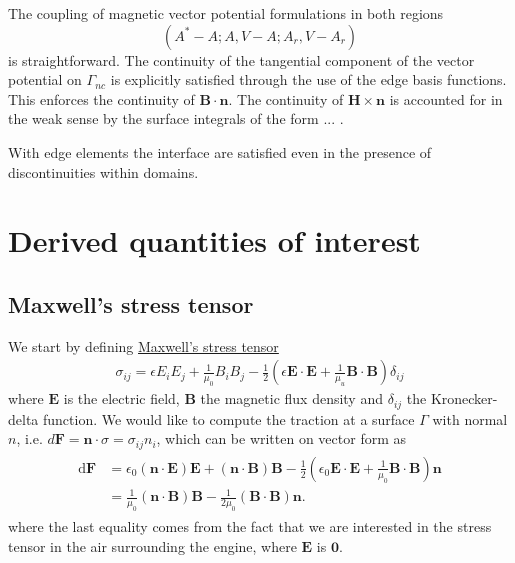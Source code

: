 \documentclass{article}
\newcommand{\mbf}[1]{\mathbf{#1}}
\begin{document}
The coupling of magnetic vector potential formulations in both regions
$$\left(A^{*}-A ; A, V-A ; A_{r}, V-A_{r}\right)$$ is straightforward.
The continuity of the tangential component of the vector potential on
$\Gamma_{n c}$ is explicitly satisfied through the use of the edge basis
functions. This enforces the continuity of $\boldsymbol{B} \cdot
\boldsymbol{n}$. The continuity of $\boldsymbol{H} \times
\boldsymbol{n}$ is accounted for in the weak sense by the surface
integrals of the form ... \cite{biro1999edge}.

With edge elements the interface are satisfied even in the presence of
discontinuities within domains.



\section{Derived quantities of interest}

\subsection{Maxwell's stress tensor}
We start by defining
\href{https://en.wikipedia.org/wiki/Maxwell_stress_tensor#Equation}{Maxwell's
stress tensor}
\begin{align*}
    \sigma_{ij} = \epsilon E_i E_j + \frac{1}{\mu_0} B_i B_j -\frac{1}{2}\left(\epsilon \mbf{E}\cdot \mbf{E} + \frac{1}{\mu_u}\mbf{B}\cdot \mbf{B} \right)\delta_{ij}
\end{align*}
where $\mbf{E}$ is the electric field, $\mbf{B}$ the magnetic flux
density and $\delta_{ij}$ the Kronecker-delta function. We would like to
compute the traction at a surface $\Gamma$ with normal $n$, i.e.
$d\mbf{F}=\mbf{n}\cdot\sigma=\sigma_{ij} n_i$, which can be written on
vector form as
\begin{align}
\begin{split}
     \mathrm{d} \mbf{F} &= \epsilon_0 (\mbf{n}\cdot\mbf{E}) \mbf{E} + (\mbf{n}\cdot \mbf{B}) \mbf{B} - \frac{1}{2} \left(\epsilon_0 \mbf{E}\cdot\mbf{E} + \frac{1}{\mu_0} \mbf{B} \cdot \mbf{B} \right)\mbf{n}\\
     &= \frac{1}{\mu_0}(\mbf{n}\cdot\mbf{B}) \mbf{B} - \frac{1}{2\mu_0}(\mbf{B}\cdot\mbf{B})\mbf{n}.
\end{split}
\end{align}
where the last equality comes from the fact that we are interested in
the stress tensor in the air surrounding the engine, where $\mbf{E}$ is
$\mbf{0}$.
\end{document}

